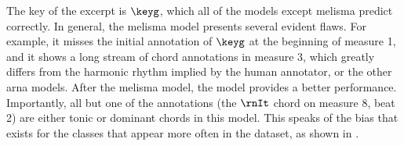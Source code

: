 The key of the excerpt is $\keyg$, which all of the models
except \gls{melisma} predict correctly. In general, the
\gls{melisma} model presents several evident flaws. For
example, it misses the initial annotation of $\keyg$ at the
beginning of measure 1, and it shows a long stream of chord
annotations in measure 3, which greatly differs from the
harmonic rhythm implied by the human annotator, or the other
\gls{arna} models. After the \gls{melisma} model, the
\textcite{chen2021attend} model provides a better
performance. Importantly, all but one of the annotations
(the $\rnIt$ chord on measure 8, beat 2) are either tonic or
dominant chords in this model. This speaks of the bias that
exists for the classes that appear more often in the
dataset, as shown in .


